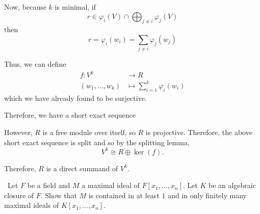 \documentclass[12pt]{AlgebraQual}
\begin{document}
\begin{solution}
\begin{enumerate}[label=(\alph*)]
   Now, because $k$ is minimal, if $$r\in \varphi_i(V)\cap\bigoplus_{j\not=i}\varphi_j(V)$$ then $$r=\varphi_i(w_i)=\sum_{j\not=i}\varphi_j(w_j)$$

   Thus, we can define \begin{align*}
       f:V^k&\to R\\
       (w_1,...,w_k)&\mapsto\sum_{i=1}^k\varphi_i(w_i)
   \end{align*}
   which we have already found to be surjective.

   Therefore, we have a short exact sequence
   \begin{center}
   \end{center}

   However, $R$ is a free module over itself, so $R$ is projective. Therefore, the above short exact sequence is split and so by the splitting lemma, $$V^k\cong R\oplus\ker(f).$$

   Therefore, $R$ is a direct summand of $V^k.$
\end{enumerate}
\end{solution}
\newpage



\begin{problem} $\,$
Let $F$ be a field and $M$ a maximal ideal of $F[x_1,...,x_n]$. Let $K$ be an algebraic closure of $F$. Show that $M$ is contained in at least $1$ and in only finitely many maximal ideals of $K[x_1,...,x_n].$
\end{problem}
\end{document}
